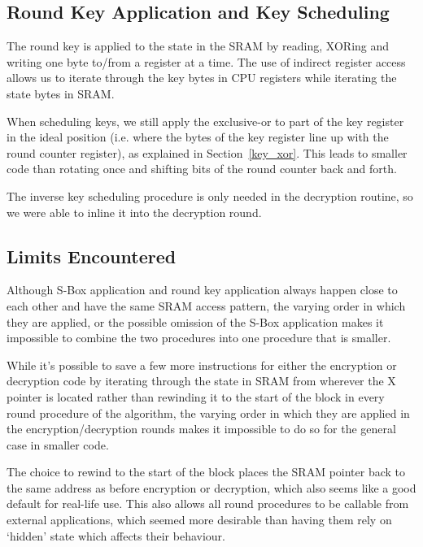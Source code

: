 \documentclass[11pt]{llncs2e} %
\begin{document}
\subsection{Round Key Application and Key Scheduling}
The round key is applied to the state in the SRAM by reading, XORing and writing one byte to/from a register at a time.
The use of indirect register access allows us to iterate through the key bytes in CPU registers while iterating the state bytes in SRAM.

When scheduling keys, we still apply the exclusive-or to part of the key register in the ideal position (i.e. where the bytes of the key register line up with the round counter register), as explained in Section~\ref{key_xor}.
This leads to smaller code than rotating once and shifting bits of the round counter back and forth.

The inverse key scheduling procedure is only needed in the decryption routine, so we were able to inline it into the decryption round.

\subsection{Limits Encountered}
Although S-Box application and round key application always happen close to each other and have the same SRAM access pattern, the varying order in which they are applied, or the possible omission of the S-Box application makes it impossible to combine the two procedures into one procedure that is smaller.

While it's possible to save a few more instructions for either the encryption or decryption code by iterating through the state in SRAM from wherever the X pointer is located rather than rewinding it to the start of the block in every round procedure of the algorithm, the varying order in which they are applied in the encryption/decryption rounds makes it impossible to do so for the general case in smaller code.

The choice to rewind to the start of the block places the SRAM pointer back to the same address as before encryption or decryption, which also seems like a good default for real-life use.
This also allows all round procedures to be callable from external applications, which seemed more desirable than having them rely on `hidden' state which affects their behaviour.
\end{document}
